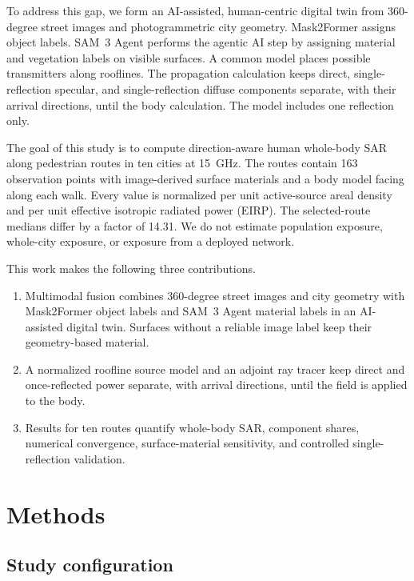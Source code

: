 \documentclass{IEEEoj}
\begin{document}
To address this gap, we form an AI-assisted, human-centric digital twin from
360-degree street images and photogrammetric city geometry. Mask2Former assigns
object labels. SAM~3 Agent performs the agentic AI step by assigning material
and vegetation labels on visible surfaces. A common model
places possible transmitters along rooflines. The propagation calculation keeps
direct, single-reflection specular, and single-reflection diffuse components
separate, with their arrival directions, until the body calculation. The model
includes one reflection only.

The goal of this study is to compute direction-aware human whole-body SAR along
pedestrian routes in ten cities at 15~GHz. The routes contain 163 observation
points with image-derived surface materials and a body model facing along each
walk. Every value is normalized per unit active-source areal density and per
unit effective isotropic radiated power (EIRP). The selected-route medians
differ by a factor of 14.31. We do not estimate population exposure,
whole-city exposure, or exposure from a deployed network.

This work makes the following three contributions.
\begin{enumerate}
  \item Multimodal fusion combines 360-degree street images and city geometry
  with Mask2Former object labels and SAM~3 Agent material labels in an
  AI-assisted digital twin. Surfaces without a reliable image label keep their
  geometry-based material.

  \item A normalized roofline source model and an adjoint ray tracer keep
  direct and once-reflected power separate, with arrival directions, until the
  field is applied to the body.

  \item Results for ten routes quantify whole-body SAR, component shares,
  numerical convergence, surface-material sensitivity, and controlled
  single-reflection validation.
\end{enumerate}

\section{Methods}
\label{sec:method}

\subsection{Study configuration}
\label{sec:configuration}
\end{document}
